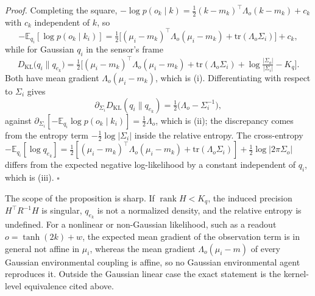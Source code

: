 \noindent\emph{Proof.} Completing the square, $-\log p(o_k\mid k) = \tfrac{1}{2}(k - m_k)^\top \Lambda_o (k - m_k) + c_k$ with $c_k$ independent of $k$, so
\begin{equation}
-\mathbb{E}_{q_i}[\log p(o_k\mid k_i)] = \tfrac{1}{2}\big[(\mu_i - m_k)^\top \Lambda_o (\mu_i - m_k) + \mathrm{tr}(\Lambda_o \Sigma_i)\big] + c_k,
\end{equation}
while for Gaussian $q_i$ in the sensor's frame
\begin{equation}
D_{\mathrm{KL}}\big(q_i \| q_{e_k}\big) = \tfrac{1}{2}\big[(\mu_i - m_k)^\top \Lambda_o (\mu_i - m_k) + \mathrm{tr}(\Lambda_o \Sigma_i) + \log\tfrac{|\Sigma_o|}{|\Sigma_i|} - K_q\big].
\end{equation}
Both have mean gradient $\Lambda_o(\mu_i - m_k)$, which is (i). Differentiating with respect to $\Sigma_i$ gives
\begin{equation}
\partial_{\Sigma_i}D_{\mathrm{KL}}(q_i \| q_{e_k}) = \tfrac{1}{2}\big(\Lambda_o - \Sigma_i^{-1}\big),
\end{equation}
against $\partial_{\Sigma_i}[-\mathbb{E}_{q_i}\log p(o_k \mid k_i)] = \tfrac{1}{2}\Lambda_o$, which is (ii); the discrepancy comes from the entropy term $-\tfrac{1}{2}\log|\Sigma_i|$ inside the relative entropy. The cross-entropy $-\mathbb{E}_{q_i}[\log q_{e_k}] = \tfrac{1}{2}[(\mu_i - m_k)^\top \Lambda_o (\mu_i - m_k) + \mathrm{tr}(\Lambda_o \Sigma_i)] + \tfrac{1}{2}\log|2\pi\Sigma_o|$ differs from the expected negative log-likelihood by a constant independent of $q_i$, which is (iii). $\square$

The scope of the proposition is sharp. If $\operatorname{rank} H < K_q$, the induced precision $H^\top R^{-1}H$ is singular, $q_{e_k}$ is not a normalized density, and the relative entropy is undefined. For a nonlinear or non-Gaussian likelihood, such as a readout $o = \tanh(2k) + w$, the expected mean gradient of the observation term is in general not affine in $\mu_i$, whereas the mean gradient $\Lambda_o(\mu_i - m)$ of every Gaussian environmental coupling is affine, so no Gaussian environmental agent reproduces it. Outside the Gaussian linear case the exact statement is the kernel-level equivalence cited above.


